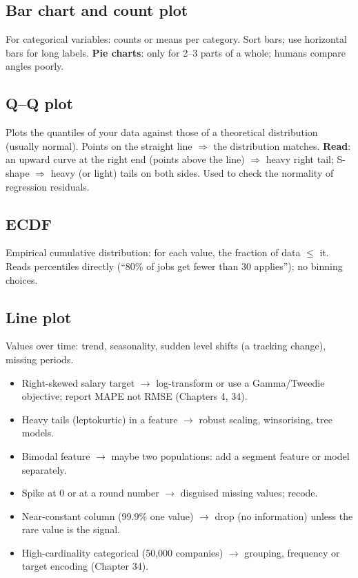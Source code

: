 \subsection{Bar chart and count plot}
For categorical variables: counts or means per category. Sort bars; use horizontal bars for long labels. \textbf{Pie charts}: only for 2--3 parts of a whole;
humans compare angles poorly.

\subsection{Q--Q plot}
Plots the quantiles of your data against those of a theoretical distribution (usually normal). Points on the straight line $\Rightarrow$ the distribution
matches. \textbf{Read}: an upward curve at the right end (points above the line) $\Rightarrow$ heavy right tail; S-shape $\Rightarrow$ heavy (or light) tails on both
sides. Used to check the normality of regression residuals.

\subsection{ECDF}
Empirical cumulative distribution: for each value, the fraction of data $\le$ it. Reads percentiles directly (``80\% of jobs get fewer than 30 applies'');
no binning choices.

\subsection{Line plot}
Values over time: trend, seasonality, sudden level shifts (a tracking change), missing periods.

\begin{practical}
\begin{itemize}
\item Right-skewed salary target $\to$ log-transform or use a Gamma/Tweedie objective; report MAPE not RMSE (Chapters 4, 34).
\item Heavy tails (leptokurtic) in a feature $\to$ robust scaling, winsorising, tree models.
\item Bimodal feature $\to$ maybe two populations: add a segment feature or model separately.
\item Spike at 0 or at a round number $\to$ disguised missing values; recode.
\item Near-constant column (99.9\% one value) $\to$ drop (no information) unless the rare value is the signal.
\item High-cardinality categorical (50{,}000 companies) $\to$ grouping, frequency or target encoding (Chapter 34).
\end{itemize}
\end{practical}

